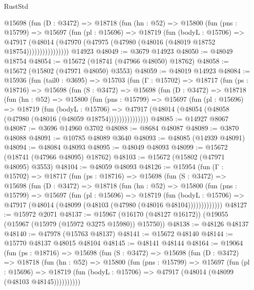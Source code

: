 \begin{lexlean}{RustStd}
\begin{coremodule}
            @15698
              (fun (D : @3472) =>
              @18718
                (fun (hn : @52) =>
                @15800
                  (fun (pns : @15799) =>
                  @15697
                    (fun (pl : @15696) =>
                    @18719
                      (fun (bodyL : @15706) =>
                      @47917
                        (@48014
                          (@47970 (@47975 (@47980 (@48016 (@48019 @18752 @18754))))))))))))))))
    @14923
@48049 := @3679 @14923
@48050 := @48049 @18754
@48054 := @15672 (@18741 (@47966 @48050) @18762)
@48058 := @15672 (@15802 (@47971 @48050) @3553)
@48059 := @48019 @14923
@48084 := @15936
    (fun (tail0 : @3695) =>
    @15703
      (fun (Γ : @15702) =>
      @18717
        (fun (ps : @18716) =>
        @15698
          (fun (S : @3472) =>
          @15698
            (fun (D : @3472) =>
            @18718
              (fun (hn : @52) =>
              @15800
                (fun (pns : @15799) =>
                @15697
                  (fun (pl : @15696) =>
                  @18719
                    (fun (bodyL : @15706) =>
                    @47917 (@48014 (@48054 (@48058 (@47980 (@48016 (@48059 @18754)))))))))))))))
@48085 := @14927 @8067
@48087 := @3696 @14960 @3702
@48088 := @8684 @48087
@48089 := @3870 @48088
@48091 := @10785 @48089 @3640
@48093 := @48085 (@14939 @48091)
@48094 := @48084 @48093
@48095 := @48049 @48093
@48099 := @15672 (@18741 (@47966 @48095) @18762)
@48103 := @15672 (@15802 (@47971 @48095) @3553)
@48104 := @48059 @48093
@48126 := @15954
    (fun (Γ : @15702) =>
    @18717
      (fun (ps : @18716) =>
      @15698
        (fun (S : @3472) =>
        @15698
          (fun (D : @3472) =>
          @18718
            (fun (hn : @52) =>
            @15800
              (fun (pns : @15799) =>
              @15697
                (fun (pl : @15696) =>
                @18719
                  (fun (bodyL : @15706) =>
                  @47917 (@48014 (@48099 (@48103 (@47980 (@48016 @48104)))))))))))))
@48127 := @15972 @2071
@48137 := @15967 (@16170 (@48127 @16172)) (@19055 (@15967 (@15979 (@15972 @3275 @15980)) @15750))
@48138 := @48126 @48137
@48140 := @47978 (@15763 @48137)
@48141 := @15672 @48140
@48144 := @15770 @48137 @48015 @48104
@48145 := @48141 @48144
@48164 := @19064
    (fun (ps : @18716) =>
    @15698
      (fun (S : @3472) =>
      @15698
        (fun (D : @3472) =>
        @18718
          (fun (hn : @52) =>
          @15800
            (fun (pns : @15799) =>
            @15697
              (fun (pl : @15696) =>
              @18719 (fun (bodyL : @15706) => @47917 (@48014 (@48099 (@48103 @48145))))))))))

\end{coremodule}
\end{lexlean}
